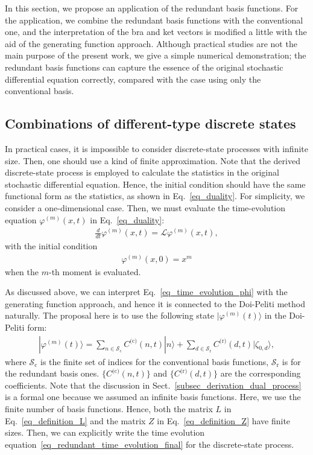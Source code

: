 \documentclass[sn-mathphys,Numbered]{sn-jnl}%
\theoremstyle{thmstyleone}%
\theoremstyle{thmstyletwo}%
\theoremstyle{thmstylethree}%
\begin{document}
In this section, we propose an application of the redundant basis functions. For the application, we combine the redundant basis functions with the conventional one, and the interpretation of the bra and ket vectors is modified a little with the aid of the generating function approach. Although practical studies are not the main purpose of the present work, we give a simple numerical demonstration; the redundant basis functions can capture the essence of the original stochastic differential equation correctly, compared with the case using only the conventional basis.



\subsection{Combinations of different-type discrete states}

In practical cases, it is impossible to consider discrete-state processes with infinite size. Then, one should use a kind of finite approximation. Note that the derived discrete-state process is employed to calculate the statistics in the original stochastic differential equation. Hence, the initial condition should have the same functional form as the statistics, as shown in Eq.~\eqref{eq_duality}. For simplicity, we consider a one-dimensional case. Then, we must evaluate the time-evolution equation $\varphi^{(m)}(x,t)$ in Eq.~\eqref{eq_duality}:
\begin{align}
\frac{d}{dt} \varphi^{(m)}(x,t) = \mathcal{L} \varphi^{(m)}(x,t),
\label{eq_time_evolution_phi}
\end{align}
with the initial condition
\begin{align}
\varphi^{(m)}(x,0) = x^m
\end{align}
when the $m$-th moment is evaluated.

As discussed above, we can interpret Eq.~\eqref{eq_time_evolution_phi} with the generating function approach, and hence it is connected to the Doi-Peliti method naturally. The proposal here is to use the following state $|\varphi^{(m)}(t)\rangle$ in the Doi-Peliti form:
\begin{align}
|\varphi^{(m)}(t)\rangle = \sum_{n \in \mathcal{S}_{\textrm{c}}} C^{\textrm{(c)}}(n,t) | n \rangle
+ \sum_{d\in \mathcal{S}_{\textrm{r}}} C^{\textrm{(r)}}(d,t) | \zeta_{0,d} \rangle,
\label{eq_propose_combined_state}
\end{align}
where $\mathcal{S}_{\textrm{c}}$ is the finite set of indices for the conventional basis functions, $\mathcal{S}_{\textrm{r}}$ is for the redundant basis ones. $\{C^{\textrm{(c)}}(n,t)\}$ and $\{C^{\textrm{(r)}}(d,t)\}$ are the corresponding coefficients. 
Note that the discussion in Sect.~\ref{subsec_derivation_dual_process} is a formal one because we assumed an infinite basis functions. Here, we use the finite number of basis functions. Hence, both the matrix $L$ in Eq.~\eqref{eq_definition_L} and the matrix $Z$ in Eq.~\eqref{eq_definition_Z} have finite sizes. Then, we can explicitly write the time evolution equation~\eqref{eq_redundant_time_evolution_final} for the discrete-state process.
\end{document}
